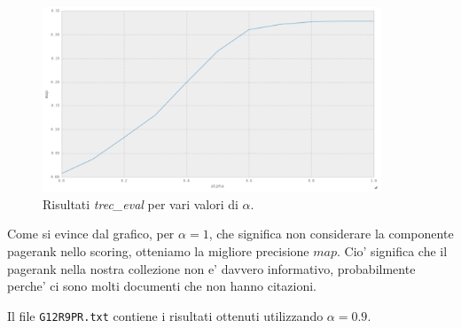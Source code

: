 \documentclass[12pt]{article}
\begin{document}
\begin{figure}[htbp]
\begin{center}
\includegraphics[width=0.9\textwidth]{map.png}
\caption{Risultati \textit{trec\_eval} per vari valori di $\alpha$.}
\label{fig:uno}
\end{center}
\end{figure}

Come si evince dal grafico, per $\alpha =1$, che significa non considerare la componente pagerank nello scoring, otteniamo la migliore precisione $map$. Cio' significa che il pagerank nella nostra collezione non e' davvero informativo, probabilmente perche' ci sono molti documenti che non hanno citazioni.

Il file \texttt{G12R9PR.txt} contiene i risultati ottenuti utilizzando $\alpha = 0.9$.



\end{document}
